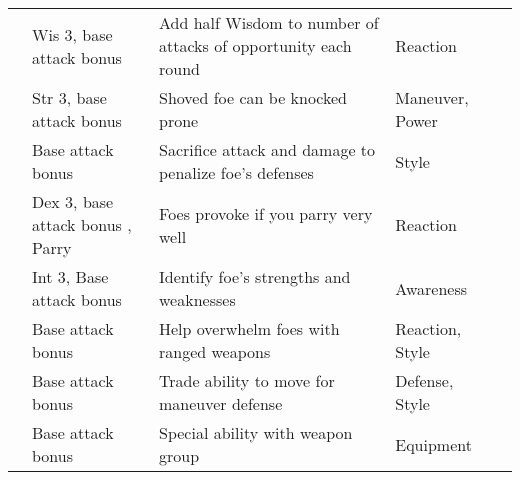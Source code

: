 {\begin{longtabu}{>{\lcol}p{10em} >{\lcol}p{15em} >{\lcol}X >{\lcol}p{6em} >{\lcol}p{3em}}
 & Wis 3, base attack bonus  & Add half Wisdom to number of attacks of opportunity each round & Reaction &  \\
 & Str 3, base attack bonus  & Shoved foe can be knocked prone & Maneuver, Power &  \\
 & Base attack bonus  & Sacrifice attack and damage to penalize foe's defenses & Style &  \\
 & Dex 3, base attack bonus , Parry & Foes provoke if you parry very well & Reaction &  \\
 & Int 3, Base attack bonus  & Identify foe's strengths and weaknesses & Awareness &  \\
 & Base attack bonus  & Help overwhelm foes with ranged weapons & Reaction, Style &  \\
 & Base attack bonus  & Trade ability to move for maneuver defense & Defense, Style &  \\
 & Base attack bonus  & Special ability with weapon group & Equipment &  \\


\end{longtabu}}

